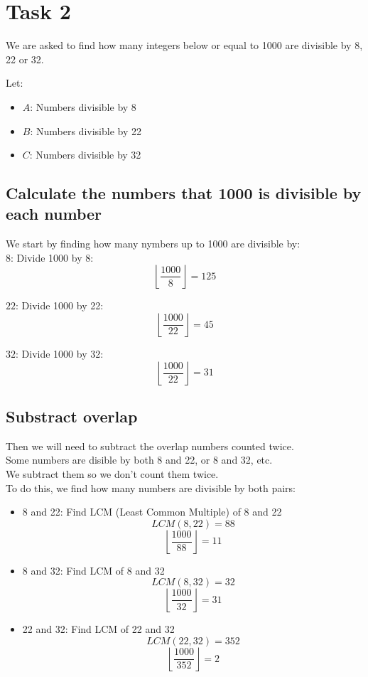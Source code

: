 \documentclass[11pt]{article}
\begin{document}
\newpage
\section{Task 2}
\label{sec:org9c325b8}
We are asked to find how many integers below or equal to 1000 are divisible by 8, 22 or 32.

Let:
\begin{itemize}
\item \(A\): Numbers divisible by 8
\item \(B\): Numbers divisible by 22
\item \(C\): Numbers divisible by 32
\end{itemize}
\subsection{Calculate the numbers that 1000 is divisible by each number}
\label{sec:org0a3e567}
We start by finding how many nymbers up to 1000 are divisible by: \\

\(8\): Divide 1000 by 8:
  \[
   \left\lfloor \frac{1000}{8} \right\rfloor = 125
   \]

\(22\): Divide 1000 by 22:
  \[
   \left\lfloor \frac{1000}{22} \right\rfloor = 45
   \]

\(32\): Divide 1000 by 32:
  \[
   \left\lfloor \frac{1000}{22} \right\rfloor = 31
   \]
\subsection{Substract overlap}
\label{sec:orgc330c07}
Then we will need to subtract the overlap numbers counted twice. \\
Some numbers are disible by both 8 and 22, or 8 and 32, etc. \\
We subtract them so we don't count them twice. \\

To do this, we find how many numbers are divisible by both pairs:
\begin{itemize}
\item 8 and 22:
Find LCM (Least Common Multiple) of 8 and 22
\[
  LCM(8, 22) = 88
  \]
\[
  \left\lfloor \frac{1000}{88} \right\rfloor = 11
  \]

\item 8 and 32:
Find LCM of 8 and 32
\[
  LCM(8, 32) = 32
  \]
\[
  \left\lfloor \frac{1000}{32} \right\rfloor = 31
  \]

\item 22 and 32:
Find LCM of 22 and 32
\[
  LCM(22, 32) = 352
  \]
\[
  \left\lfloor \frac{1000}{352} \right\rfloor = 2
  \]
\end{itemize}
\end{document}
